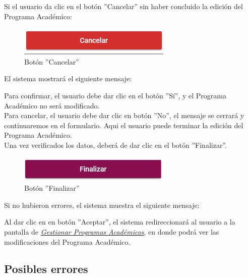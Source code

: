         Si el usuario da clic en el botón ''Cancelar'' sin haber concluido la edición del Programa Académico:

        \begin{figure}[!hbtp]
        	\centering
        	\hypertarget{cancel2}{\includegraphics[width=0.7\linewidth]{images/SP3/BtnCancelar}}
        	\caption{Botón ''Cancelar''}
        	\label{cancel2}
        \end{figure}

        El sistema mostrará el siguiente mensaje:

        Para confirmar, el usuario debe dar clic en el botón ''Sí'', y el Programa Académico no será modificado.\\

        Para cancelar, el usuario debe dar clic en botón ''No'', el mensaje se cerrará y continuaremos en el formulario. Aqui el usuario puede terminar la edición del Programa Académico.\\

        Una vez verificados los datos, deberá de dar clic en el botón ''Finalizar''.
        \begin{figure}[!hbtp]
        	\centering
        	\hypertarget{btnfin}{\includegraphics[width=0.7\linewidth]{images/SP3/BtnFinalizar}}
        	\caption{Botón ''Finalizar''}
        	\label{btnfin}
        \end{figure}

        Si no hubieron errores, el sistema muestra el siguiente mensaje:

        Al dar clic en en botón ''Aceptar'', el sistema redireccionará al usuario a la pantalla de \hyperlink{consultarpa}{\textit{Gestionar Programas Académicos}}, en donde podrá ver las modificaciones del Programa Académico.\\

        \subsection{Posibles errores}

